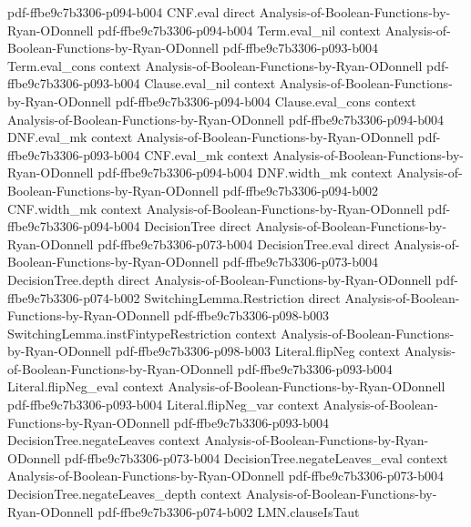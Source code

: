 \begin{lemma}
  {pdf-ffbe9c7b3306-p094-b004}
\proofstep
  {CNF.eval}
  {direct}
  {Analysis-of-Boolean-Functions-by-Ryan-ODonnell}
  {pdf-ffbe9c7b3306-p094-b004}
\proofstep
  {Term.eval_nil}
  {context}
  {Analysis-of-Boolean-Functions-by-Ryan-ODonnell}
  {pdf-ffbe9c7b3306-p093-b004}
\proofstep
  {Term.eval_cons}
  {context}
  {Analysis-of-Boolean-Functions-by-Ryan-ODonnell}
  {pdf-ffbe9c7b3306-p093-b004}
\proofstep
  {Clause.eval_nil}
  {context}
  {Analysis-of-Boolean-Functions-by-Ryan-ODonnell}
  {pdf-ffbe9c7b3306-p094-b004}
\proofstep
  {Clause.eval_cons}
  {context}
  {Analysis-of-Boolean-Functions-by-Ryan-ODonnell}
  {pdf-ffbe9c7b3306-p094-b004}
\proofstep
  {DNF.eval_mk}
  {context}
  {Analysis-of-Boolean-Functions-by-Ryan-ODonnell}
  {pdf-ffbe9c7b3306-p093-b004}
\proofstep
  {CNF.eval_mk}
  {context}
  {Analysis-of-Boolean-Functions-by-Ryan-ODonnell}
  {pdf-ffbe9c7b3306-p094-b004}
\proofstep
  {DNF.width_mk}
  {context}
  {Analysis-of-Boolean-Functions-by-Ryan-ODonnell}
  {pdf-ffbe9c7b3306-p094-b002}
\proofstep
  {CNF.width_mk}
  {context}
  {Analysis-of-Boolean-Functions-by-Ryan-ODonnell}
  {pdf-ffbe9c7b3306-p094-b004}
\proofstep
  {DecisionTree}
  {direct}
  {Analysis-of-Boolean-Functions-by-Ryan-ODonnell}
  {pdf-ffbe9c7b3306-p073-b004}
\proofstep
  {DecisionTree.eval}
  {direct}
  {Analysis-of-Boolean-Functions-by-Ryan-ODonnell}
  {pdf-ffbe9c7b3306-p073-b004}
\proofstep
  {DecisionTree.depth}
  {direct}
  {Analysis-of-Boolean-Functions-by-Ryan-ODonnell}
  {pdf-ffbe9c7b3306-p074-b002}
\proofstep
  {SwitchingLemma.Restriction}
  {direct}
  {Analysis-of-Boolean-Functions-by-Ryan-ODonnell}
  {pdf-ffbe9c7b3306-p098-b003}
\proofstep
  {SwitchingLemma.instFintypeRestriction}
  {context}
  {Analysis-of-Boolean-Functions-by-Ryan-ODonnell}
  {pdf-ffbe9c7b3306-p098-b003}
\proofstep
  {Literal.flipNeg}
  {context}
  {Analysis-of-Boolean-Functions-by-Ryan-ODonnell}
  {pdf-ffbe9c7b3306-p093-b004}
\proofstep
  {Literal.flipNeg_eval}
  {context}
  {Analysis-of-Boolean-Functions-by-Ryan-ODonnell}
  {pdf-ffbe9c7b3306-p093-b004}
\proofstep
  {Literal.flipNeg_var}
  {context}
  {Analysis-of-Boolean-Functions-by-Ryan-ODonnell}
  {pdf-ffbe9c7b3306-p093-b004}
\proofstep
  {DecisionTree.negateLeaves}
  {context}
  {Analysis-of-Boolean-Functions-by-Ryan-ODonnell}
  {pdf-ffbe9c7b3306-p073-b004}
\proofstep
  {DecisionTree.negateLeaves_eval}
  {context}
  {Analysis-of-Boolean-Functions-by-Ryan-ODonnell}
  {pdf-ffbe9c7b3306-p073-b004}
\proofstep
  {DecisionTree.negateLeaves_depth}
  {context}
  {Analysis-of-Boolean-Functions-by-Ryan-ODonnell}
  {pdf-ffbe9c7b3306-p074-b002}
\proofstep
  {LMN.clauseIsTaut}

\end{lemma}
